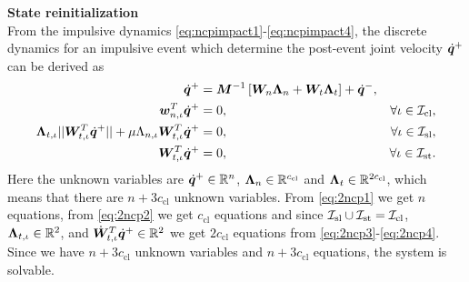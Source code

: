 \documentclass[../DC2017114Bouma.tex]{subfiles}
\begin{document}
\textbf{State reinitialization}\\
From the impulsive dynamics \eqref{eq:ncpimpact1}-\eqref{eq:ncpimpact4}, the discrete dynamics for an impulsive event which determine the post-event joint velocity $\dot{{\boldsymbol{q}}}^+$ can be derived as
\begin{align}
\dot{{\boldsymbol{q}}}^+ &= {\boldsymbol{M}}^{-1}\left[{\boldsymbol{W}}_{n}\boldsymbol{\Lambda}_{n} + {\boldsymbol{W}}_{t}\boldsymbol{\Lambda}_{t}\right] + \dot{{\boldsymbol{q}}}^-, \label{eq:2ncp1}\\
{\boldsymbol{w}}^T_{n,\iota}\dot{{\boldsymbol{q}}}^+ &= 0, &\forall \iota\in\mathcal{I}_{\text{cl}},\label{eq:2ncp2}\\
\boldsymbol{\Lambda}_{t,\iota}||{\boldsymbol{W}}^T_{t,\iota}\dot{{\boldsymbol{q}}}^+|| + \mu\Lambda_{n,\iota}{\boldsymbol{W}}^T_{t,\iota}\dot{{\boldsymbol{q}}}^+&= 0, &\forall \iota\in\mathcal{I}_{\text{sl}},\label{eq:2ncp3}\\
{\boldsymbol{W}}^T_{t,\iota}\dot{{\boldsymbol{q}}}^+ &= 0, &\forall \iota\in\mathcal{I}_{\text{st}}.\label{eq:2ncp4}
\end{align}
Here the unknown variables are $\dot{{\boldsymbol{q}}}^+\in\mathbb{R}^{n}$, $\boldsymbol{\Lambda}_{n}\in\mathbb{R}^{c_{\text{cl}}}$ and $\boldsymbol{\Lambda}_{t}\in\mathbb{R}^{2c_{\text{cl}}}$, which means that there are $n+3c_{\text{cl}}$ unknown variables. From \eqref{eq:2ncp1} we get $n$ equations, from \eqref{eq:2ncp2} we get $c_{\text{cl}}$ equations and since $\mathcal{I}_{\text{sl}}\cup\mathcal{I}_{\text{st}}=\mathcal{I}_{\text{cl}}$, $\boldsymbol{\Lambda}_{t,\iota}\in\mathbb{R}^2$, and $\dot{{\boldsymbol{W}}}^T_{t,\iota}\dot{{\boldsymbol{q}}}^+ \in\mathbb{R}^2$ we get $2c_{\text{cl}}$ equations from \eqref{eq:2ncp3}-\eqref{eq:2ncp4}. Since we have $n+3c_{\text{cl}}$ unknown variables and $n+3c_{\text{cl}}$ equations, the system is solvable.
\end{document}
